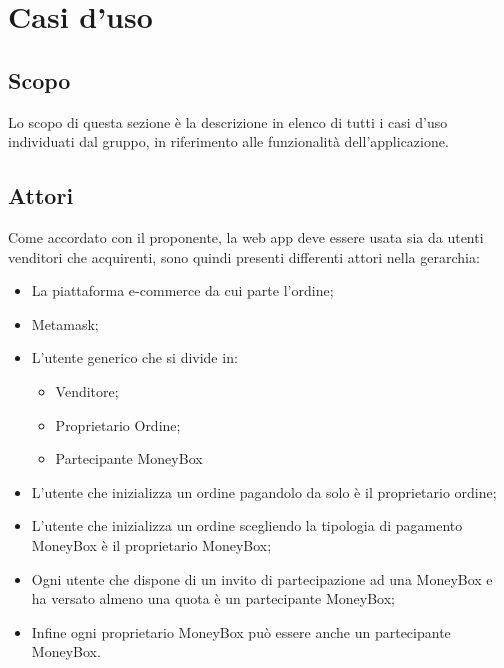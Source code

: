 \section{Casi d'uso} \label{section:casi_uso}

\subsection{Scopo}
Lo scopo di questa sezione è la descrizione in elenco di tutti i casi d'uso individuati dal gruppo, in
riferimento alle funzionalità dell'applicazione.

\subsection{Attori}
Come accordato con il proponente, la web app\glo{} deve essere usata sia da utenti venditori che acquirenti,
sono quindi presenti differenti attori nella gerarchia: 
\begin{itemize}
    \item La piattaforma e-commerce\glo{} da cui parte l'ordine;
    \item Metamask\glo{};
    \item L'utente generico che si divide in:
        \begin{itemize}
            \item Venditore;
            \item Proprietario Ordine;
            \item Partecipante MoneyBox
        \end{itemize}
    \item L'utente che inizializza un ordine pagandolo da solo è il proprietario ordine;
    \item L'utente che inizializza un ordine scegliendo la tipologia di pagamento MoneyBox\glo{} è il proprietario MoneyBox\glo{};
    \item Ogni utente che dispone di un invito di partecipazione ad una MoneyBox\glo{} e ha versato almeno una quota è un partecipante MoneyBox\glo{};
    \item Infine ogni proprietario MoneyBox\glo{} può essere anche un partecipante MoneyBox\glo{}.
\end{itemize}

